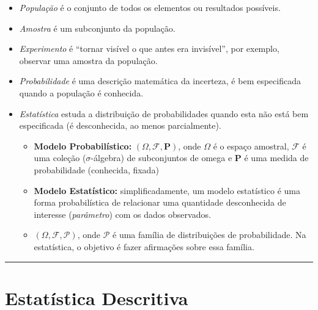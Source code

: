 \documentclass[
]{book}
\providecommand{\tightlist}{%
  \setlength{\itemsep}{0pt}\setlength{\parskip}{0pt}}
\begin{document}
\begin{itemize}
\item
  \emph{População} é o conjunto de todos os elementos ou resultados possíveis.\\
\item
  \emph{Amostra} é um subconjunto da população.\\
\item
  \emph{Experimento} é ``tornar visível o que antes era invisível'', por exemplo, observar uma amostra da população.\\
\item
  \emph{Probabilidade} é uma descrição matemática da incerteza, é bem especificada quando a população é conhecida.\\
\item
  \emph{Estatística} estuda a distribuição de probabilidades quando esta não está bem especificada (é desconhecida, ao menos parcialmente).

  \begin{itemize}
  \tightlist
  \item
    \textbf{Modelo Probabilístico:} \((\Omega, \mathcal{F}, \boldsymbol{P})\), onde \(\Omega\) é o espaço amostral, \(\mathcal{F}\) é uma coleção (\(\sigma\)-álgebra) de subconjuntos de omega e \(\boldsymbol{P}\) é uma medida de probabilidade (conhecida, fixada)\\
  \item
    \textbf{Modelo Estatístico:} simplificadamente, um modelo estatístico é uma forma probabilística de relacionar uma quantidade desconhecida de interesse (\emph{parâmetro}) com os dados observados.\\
  \item
    \((\Omega, \mathcal{F}, \mathcal{P})\), onde \(\mathcal{P}\) é uma família de distribuições de probabilidade. Na estatística, o objetivo é fazer afirmações sobre essa família.
  \end{itemize}
\end{itemize}

\begin{center}\rule{0.5\linewidth}{0.5pt}\end{center}

\section{Estatística Descritiva}\label{estatuxedstica-descritiva}
\end{document}
